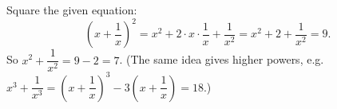 Square the given equation:
\[
\left(x+\dfrac{1}{x}\right)^2=x^2+2\cdot x\cdot\dfrac{1}{x}+\dfrac{1}{x^2}=x^2+2+\dfrac{1}{x^2}=9 .
\]
So $x^2+\dfrac{1}{x^2}=9-2=\boxed{7}$. (The same idea gives higher powers, e.g. $x^3+\dfrac{1}{x^3}=\left(x+\dfrac{1}{x}\right)^3-3\left(x+\dfrac{1}{x}\right)=18$.)
